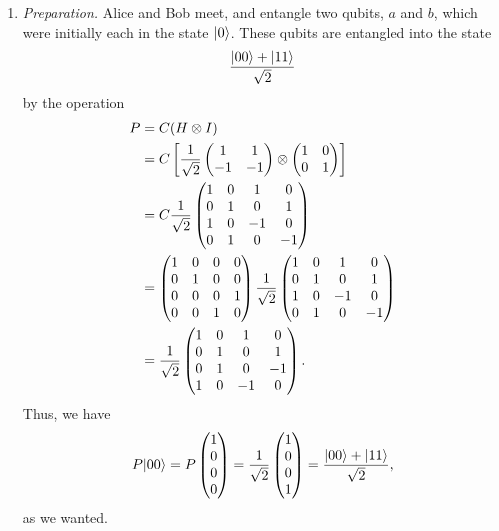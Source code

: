 \documentclass[12pt]{amsart}
\begin{document}
\begin{enumerate}
  \item \emph{Preparation.}  Alice and Bob meet, and entangle two qubits, $a$
    and $b$, which were initially each in the state ${\left\vert{0}\right\rangle}$.  These qubits
    are entangled into the state \[ \frac{{\left\vert{00}\right\rangle} + {\left\vert{11}\right\rangle}}{\sqrt{2}} \] by
    the operation
    \begin{align*}
      P
      &= C(H \otimes I) \\
      &= C
         \left[ \frac{1}{\sqrt{2}}
                \begin{pmatrix} 1 & 1 \\ -1 & -1 \end{pmatrix}
                \otimes
                \begin{pmatrix} 1 & 0 \\  0 &  1 \end{pmatrix} \right] \\
      &= C
         \frac{1}{\sqrt{2}}
         \begin{pmatrix}
           1 & 0 &  1 &  0 \\
           0 & 1 &  0 &  1 \\
           1 & 0 & -1 &  0 \\
           0 & 1 &  0 & -1
         \end{pmatrix} \\
      &= \begin{pmatrix}
           1 & 0 & 0 & 0 \\
           0 & 1 & 0 & 0 \\
           0 & 0 & 0 & 1 \\
           0 & 0 & 1 & 0
         \end{pmatrix}
         \frac{1}{\sqrt{2}}
         \begin{pmatrix}
           1 & 0 &  1 &  0 \\
           0 & 1 &  0 &  1 \\
           1 & 0 & -1 &  0 \\
           0 & 1 &  0 & -1
         \end{pmatrix} \\
      &= \frac{1}{\sqrt{2}}
         \begin{pmatrix}
           1 & 0 &  1 &  0 \\
           0 & 1 &  0 &  1 \\
           0 & 1 &  0 & -1 \\
           1 & 0 & -1 &  0
         \end{pmatrix}.
    \end{align*}
    Thus, we have \[ P{\left\vert{00}\right\rangle} = P\begin{pmatrix} 1 \\ 0 \\ 0 \\ 0 \end{pmatrix}
    = \frac{1}{\sqrt{2}} \begin{pmatrix} 1 \\ 0 \\ 0 \\ 1 \end{pmatrix} =
    \frac{{\left\vert{00}\right\rangle} + {\left\vert{11}\right\rangle}}{\sqrt{2}}, \] as we wanted.


\end{enumerate}
\end{document}
